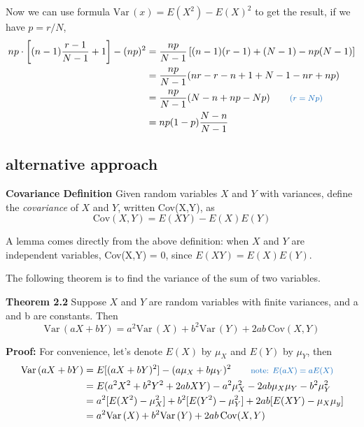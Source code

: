 \documentclass[11pt]{article}
\def\Var{{\textrm{Var}}\,}
\begin{document}
Now we can use formula $\Var (x) = E(X^2) - E(X)^2$ to get the result,  if we have $p= r/N$,
\[
\begin{aligned}
np \cdot \left[ (n-1) \frac{r-1}{N-1} +1 \right] - (np)^2
&=\frac{np}{N-1} \left[ (n-1)(r-1) +(N-1) - np(N-1) \right] \\
&=\frac{np}{N-1} (nr - r - n + 1 + N -1 -nr +np) \\
&=\frac{np}{N-1} (N -n + np - Np) \qquad \text{\color{RoyalBlue} \footnotesize ($r=Np$) } \\ 
&=np(1-p) \frac{N-n}{N-1} \\
\end{aligned}
\]


\subsection{\small alternative approach}

\begin{tcolorbox}[
	enhanced, 
	width=\textwidth, 
	fontupper=\normalsize,%
	drop fuzzy shadow southwest,
	boxrule=0.4pt,
	sharp corners,
	colframe=yellow!80!black,
	colback=yellow!10]
	
\textbf{\color{RoyalBlue} Covariance Definition} \quad Given random variables $X$ and $Y$ with variances, define the \textit{covariance} of $X$ and $Y$, written Cov(X,Y),  as
\[ 
\text{Cov}(X,Y) = E(XY) - E(X)E(Y)
\]

\end{tcolorbox}


A lemma comes directly from the above definition: when $X$ and $Y$ are independent variables,  Cov(X,Y) = 0,  since $E(XY) = E(X)E(Y)$.  

The following theorem is to find the variance of the sum of two variables.

\begin{tcolorbox}[
	enhanced, 
	width=\textwidth, 
	fontupper=\normalsize,%
	drop fuzzy shadow southwest,
	boxrule=0.4pt,
	sharp corners,
	colframe=yellow!80!black,
	colback=yellow!10]
	
\textbf{\color{RoyalBlue} Theorem 2.2} \quad Suppose $X$ and $Y$ are random variables with finite variances, and a and b are constants.  Then
\[ 
\Var (aX + bY) = a^2 \Var(X) + b^2 \Var(Y) + 2ab \, \text{Cov} (X,Y)
\]

\end{tcolorbox}

\textbf{Proof:} For convenience,  let's denote $E(X)$ by $\mu_X$ and $E(Y)$ by $\mu_Y$,  then
\[
\begin{aligned}
\Var (aX + bY) 
&= E[(aX+bY)^2] - (a\mu_X + b\mu_Y)^2 \qquad \text{\color{RoyalBlue} \footnotesize note: $E(aX)=aE(X)$}  \\
&=E(a^2X^2 + b^2Y^2 + 2abXY) - a^2\mu_X^2- 2ab\mu_X\mu_Y - b^2\mu_Y^2 \\
&=a^2 [E(X^2)-\mu_X^2] + b^2 [E(Y^2) - \mu_Y^2] + 2ab[E(XY)-\mu_X\mu_y] \\ 
&=a^2 \Var(X) + b^2\Var(Y) + 2ab \, \text{Cov}(X,Y) \\
\end{aligned}
\]
\end{document}
